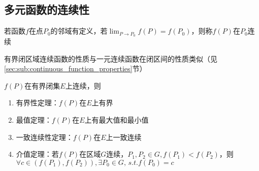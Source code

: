 \subsection{多元函数的连续性}
\begin{definition}[连续性]
若函数$f$在点$P_0$的邻域有定义，若$\lim_{P\to P_0}f(P)=f(P_0)$，则称$f(P)$在$P_0$连续
\end{definition}
有界闭区域连续函数的性质与一元连续函数在闭区间的性质类似（见\ref{sec:sub:continuous_function_properties}节）
\begin{theorem}
$f(P)$在有界闭集$E$上连续，则
\begin{enumerate}
	\item 有界性定理：$f(P)$在$E$上有界
	\item 最值定理：$f(P)$在$E$上有最大值和最小值
	\item 一致连续性定理：$f(P)$在$E$上一致连续
	\item 介值定理：若$f(P)$在区域$G$连续，$P_1,P_2\in G,f(P_1)<f(P_2)$，则$\forall c\in (f(P_1),f(P_2)),\exists P_0\in G,\,s.t. f(P_0)=c$
\end{enumerate}
\end{theorem}